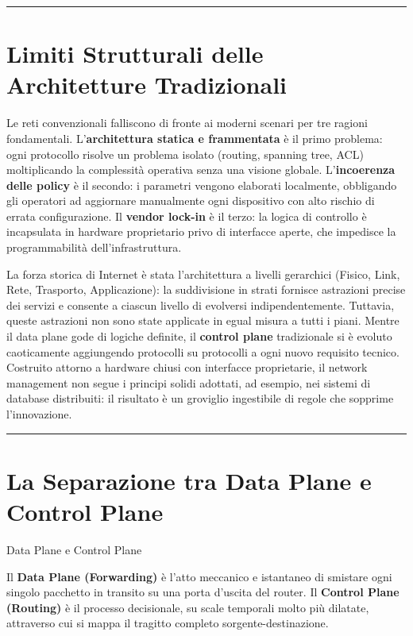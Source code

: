 \documentclass[
  italian,
  openany]{book}
\begin{document}
\begin{center}\rule{0.5\linewidth}{0.5pt}\end{center}

\section{Limiti Strutturali delle Architetture
Tradizionali}\label{limiti-strutturali-delle-architetture-tradizionali}

Le reti convenzionali falliscono di fronte ai moderni scenari per tre
ragioni fondamentali. L'\textbf{architettura statica e frammentata} è il
primo problema: ogni protocollo risolve un problema isolato (routing,
spanning tree, ACL) moltiplicando la complessità operativa senza una
visione globale. L'\textbf{incoerenza delle policy} è il secondo: i
parametri vengono elaborati localmente, obbligando gli operatori ad
aggiornare manualmente ogni dispositivo con alto rischio di errata
configurazione. Il \textbf{vendor lock-in} è il terzo: la logica di
controllo è incapsulata in hardware proprietario privo di interfacce
aperte, che impedisce la programmabilità dell'infrastruttura.

La forza storica di Internet è stata l'architettura a livelli gerarchici
(Fisico, Link, Rete, Trasporto, Applicazione): la suddivisione in strati
fornisce astrazioni precise dei servizi e consente a ciascun livello di
evolversi indipendentemente. Tuttavia, queste astrazioni non sono state
applicate in egual misura a tutti i piani. Mentre il data plane gode di
logiche definite, il \textbf{control plane} tradizionale si è evoluto
caoticamente aggiungendo protocolli su protocolli a ogni nuovo requisito
tecnico. Costruito attorno a hardware chiusi con interfacce
proprietarie, il network management non segue i principi solidi
adottati, ad esempio, nei sistemi di database distribuiti: il risultato
è un groviglio ingestibile di regole che sopprime l'innovazione.

\begin{center}\rule{0.5\linewidth}{0.5pt}\end{center}

\section{La Separazione tra Data Plane e Control
Plane}\label{la-separazione-tra-data-plane-e-control-plane}

\begin{calloutdefinition}{Data Plane e Control Plane}

Il \textbf{Data Plane (Forwarding)} è l'atto meccanico e istantaneo di
smistare ogni singolo pacchetto in transito su una porta d'uscita del
router. Il \textbf{Control Plane (Routing)} è il processo decisionale,
su scale temporali molto più dilatate, attraverso cui si mappa il
tragitto completo sorgente-destinazione.

\end{calloutdefinition}
\end{document}
